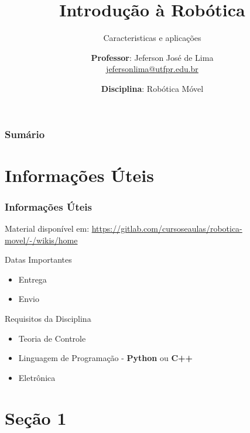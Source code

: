 \documentclass[t]{beamer}
\title[\textit{Introdução à robótica móvel}]{
  Introdução à Robótica}
\subtitle{Caracteristicas e aplicações}
\author[Professor: Jeferson José de Lima]{
  \textbf{Professor}: Jeferson José de Lima \\\medskip
  {\small \url{jefersonlima@utfpr.edu.br}}}
\institute[UTFPR-PB]{
  Departamento de Informática (DAINF)}
\date[2017.1]{\textbf{Disciplina}: Robótica Móvel}
\newcommand{\pausar}{\pause}
\begin{document}
\begin{frame}
  \titlepage
\end{frame}

\begin{frame}
	\frametitle{Sumário}
	{\small {\small \tableofcontents}}
\end{frame}


\section{Informações Úteis}
\begin{frame} 
	\frametitle{Informações Úteis}
	\begin{block}{Material disponível em:}
		\href{Robótica Móvel - Wiki}{https://gitlab.com/cursoseaulas/robotica-movel/-/wikis/home}
	\end{block}
	\pausar
	\begin{alertblock}{Datas Importantes}
		\begin{itemize}
		\item Entrega
		\item Envio
		\end{itemize}
	\end{alertblock}
	\pausar
	\begin{exampleblock}{Requisitos da Disciplina}
		\begin{itemize}
		\item Teoria de Controle
		\item Linguagem de Programação - \textbf{Python} ou \textbf{C++}
		\item Eletrônica
		\end{itemize}
	\end{exampleblock}
\end{frame}

\section{Seção 1}
\begin{frame}

\end{frame}
\end{document}
